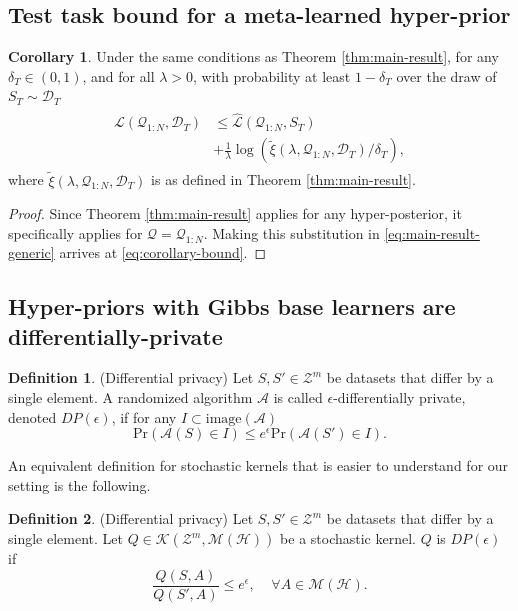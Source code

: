 \documentclass{article} %
\theoremstyle{definition}
\newtheorem{defn}{Definition}[section]
\newtheorem{corollary}[theorem]{Corollary}
\begin{document}
\subsection{Test task bound for a meta-learned hyper-prior} \label{append:corollary-bound}
\begin{corollary} \label{thm:corollary-base}
	Under the same conditions as Theorem \ref{thm:main-result},
	for any $\delta_T \in (0,1)$, and for all $\lambda>0$, with probability at least $1-\delta_T$ over the draw of $S_T\sim \mathcal{D}_T$
%	
    \begin{align} \label{eq:corollary-bound}
    \begin{split}
    \mathcal{L}(\mathcal{Q}_{1:N}, \mathcal{D}_T) &\leq \hat{\mathcal{L}}(\mathcal{Q}_{1:N}, S_T)\\
	&+\frac{1}{\lambda}\log\left (\tilde{\xi}(\lambda,\mathcal{Q}_{1:N},\mathcal{D}_T)/\delta_T\right ) ,
    \end{split}
    \end{align}
	where $\tilde{\xi}(\lambda,\mathcal{Q}_{1:N},\mathcal{D}_T)$ is as defined in  Theorem \ref{thm:main-result}.
\end{corollary}
%
\begin{proof}
    Since Theorem \ref{thm:main-result} applies for any hyper-posterior, it specifically applies for $\mathcal{Q}=\mathcal{Q}_{1:N}$.
    Making this substitution in \eqref{eq:main-result-generic} arrives at \eqref{eq:corollary-bound}.
\end{proof}

\subsection{Hyper-priors with Gibbs base learners are differentially-private} \label{append:proof-dp}

\begin{defn} (Differential privacy) \citep{Dwork2006}
	Let $S,S'\in \mathcal{Z}^m$ be datasets that differ by a single element.
	A randomized algorithm $\mathcal{A}$ is called  $\epsilon$-differentially private, denoted $DP(\epsilon)$, if for any $I\subset \mathrm{image}(\mathcal{A})$
%	
	$$
	\mathrm{Pr}(\mathcal{A}(S)\in I)\leq e^\epsilon \mathrm{Pr}(\mathcal{A}(S')\in I) .
	$$
\end{defn}\label{def:diff_privacy}

An equivalent definition for stochastic kernels that is easier to understand for our setting is the following. 
%
\begin{defn} (Differential privacy)
	Let $S,S'\in \mathcal{Z}^m$ be datasets that differ by a single element.
	Let $Q\in \mathcal{K}(\mathcal{Z}^m, \mathcal{M}(\mathcal{H}))$ be a stochastic kernel.
	$Q$ is $DP(\epsilon)$ if 
%	
	$$\frac{Q(S, A)}{Q(S', A)} \leq e^\epsilon, \;\;\;\; \forall A\in  \mathcal{M}(\mathcal{H}) .$$
\end{defn}
\end{document}
